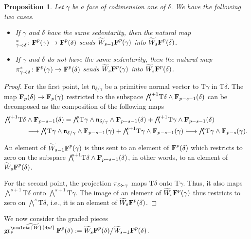 \documentclass[11pt]{amsart}
\newtheorem{prop}[thm]{Proposition}
\theoremstyle{definition}
\numberwithin{equation}{section}
\newcommand{\ie}{i.e.}
\renewcommand{\~}{\widetilde}
\newcommand{\hooklongrightarrow}{\lhook\joinrel\longrightarrow}
\newcommand{\rquot}[2]{#1\big/#2}
\let\oldbigwedge\bigwedge
\renewcommand{\bigwedge}{{\textstyle\oldbigwedge\!}}
\DeclareMathOperator{\gr}{gr} %
\newcommand{\TT}{\mathrm{T}} %
\let\i\relax
\newcommand{\i}{{\mathop{}\mathrm{i}}} %
\newcommand{\SF}{\textrm{\bf F}} %
\newcommand{\nvect}{\mathfrak n} %
\newcommand{\subface}{\prec}
\newcommand{\ssubface}{\mathbin{\mathchoice
  {\subface\!\!\!\cdot}%
  {\subface\!\!\!\cdot}%
  {\subface\!\cdot}%
  {\subface\!\cdot}%
}} %
\newcommand{\supface}{\succ}
\newcommand{\ssupface}{\mathbin{\mathchoice
  {\cdot\!\!\!\supface}%
  {\cdot\!\!\!\supface}%
  {\cdot\!\supface}%
  {\cdot\!\supface}%
}}
\newcommand{\ws}{\scaleto{W}{4pt}}
\begin{document}
\begin{prop} Let $\gamma$ be a face of codimension one of $\delta$. We have the following two cases.
\begin{itemize}
\item If $\gamma$ and $\delta$ have the same sedentarity, then the natural map $\i^*_{\gamma\ssubface\delta}\colon\SF^p(\gamma) \to \SF^p(\delta)$ sends $\~ W_{s-1}\SF^p(\gamma)$ into $\~ W_s\SF^p(\delta)$.
\item If $\gamma$ and $\delta$ do not have the same sedentarity, then the natural map $\pi^*_{\gamma\ssubface\delta}\colon\SF^p(\gamma) \to \SF^p(\delta)$ sends $\~ W_s\SF^p(\gamma)$ into $\~ W_s\SF^p(\delta)$.
\end{itemize}
\end{prop}
\begin{proof}
For the first point, let $\nvect_{\delta/\gamma}$ be a primitive normal vector to $\TT\gamma$ in $\TT\delta$. The map $\SF_p(\delta) \to \SF_p(\gamma)$ restricted to the subspace $\bigwedge^{s+1} \TT\delta  \wedge \SF_{p-s-1}(\delta)$ can be decomposed as the composition of the following maps
\begin{align*}
\bigwedge^{s+1} \TT\delta & \wedge \SF_{p-s-1}(\delta) = \bigwedge^{s} \TT\gamma \wedge \nvect_{\delta/\gamma} \wedge \SF_{p-s-1}(\delta) + \bigwedge^{s+1} \TT\gamma \wedge \SF_{p-s-1}(\delta) \\
&\longrightarrow \bigwedge^{s} \TT\gamma \wedge \nvect_{\delta/\gamma} \wedge \SF_{p-s-1}(\gamma) + \bigwedge^{s+1} \TT\gamma \wedge \SF_{p-s-1}(\gamma)\hooklongrightarrow \bigwedge^{s} \TT\gamma  \wedge \SF_{p-s}(\gamma).
\end{align*}

An element of $\~W_{s-1}\SF^p(\gamma)$ is thus sent to an element of $\SF^p(\delta)$ which restricts to zero on the subspace $\bigwedge^{s+1} \TT\delta \wedge \SF_{p-s-1}(\delta)$, in other words, to an element of $\~ W_s\SF^p(\delta)$.

\medskip

For the second point, the projection $\pi_{\delta\ssupface\gamma}$ maps $\TT\delta$ onto $\TT\gamma$. Thus, it also maps $\bigwedge^{s+1}\TT\delta$ onto $\bigwedge^{s+1}\TT\gamma$. The image of an element of $\~W_s\SF^p(\gamma)$ thus restricts to zero on $\bigwedge^s\TT\delta$, \ie, it is an element of $\~W_s\SF^p(\delta)$.
\end{proof}

We now consider the graded pieces $\gr_{s}^{\~ \ws} \SF^p(\delta) := \rquot {\~ W_s \SF^p(\delta)} {\~ W_{s-1}\SF^p(\delta)}$.
\end{document}
